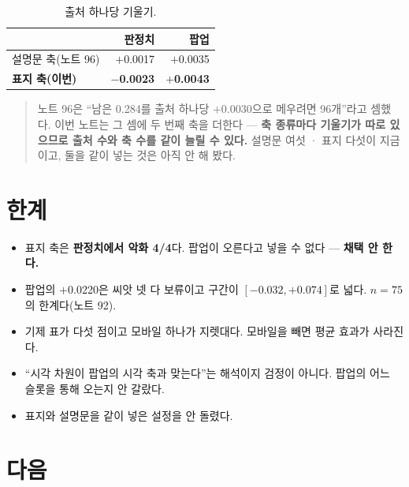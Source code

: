 \documentclass[10pt]{article}
\begin{document}
\begin{table}[t]
\centering\tsize
\caption{출처 하나당 기울기.}
\begin{tabular}{lrr}
\toprule
& 판정치 & 팝업 \\
\midrule
설명문 축(노트 96) & $+$0.0017 & $+$0.0035 \\
\textbf{표지 축(이번)} & \textbf{$-$0.0023} & \textbf{$+$0.0043} \\
\bottomrule
\end{tabular}
\end{table}


\begin{quote}\fontsize{9.5}{11.5}\selectfont
노트 96은 ``남은 0.284를 출처 하나당 $+$0.0030으로 메우려면 96개''라고 셈했다.
이번 노트는 그 셈에 두 번째 축을 더한다 --- \textbf{축 종류마다 기울기가
따로 있으므로 출처 수와 축 수를 같이 늘릴 수 있다.} 설명문 여섯 · 표지 다섯이
지금이고, 둘을 같이 넣는 것은 아직 안 해 봤다.
\end{quote}

\section{한계}

\begin{itemize}[leftmargin=1.1em,itemsep=0.15em]
\item 표지 축은 \textbf{판정치에서 악화 4/4}다. 팝업이 오른다고 넣을 수 없다 ---
      \textbf{채택 안 한다.}
\item 팝업의 $+$0.0220은 씨앗 넷 다 보류이고 구간이 $[-0.032, +0.074]$로 넓다.
      $n{=}75$의 한계다(노트 92).
\item 기제 표가 다섯 점이고 모바일 하나가 지렛대다. 모바일을 빼면 평균 효과가
      사라진다.
\item ``시각 차원이 팝업의 시각 축과 맞는다''는 해석이지 검정이 아니다. 팝업의
      어느 슬롯을 통해 오는지 안 갈랐다.
\item 표지와 설명문을 같이 넣은 설정을 안 돌렸다.
\end{itemize}

\section{다음}
\end{document}
